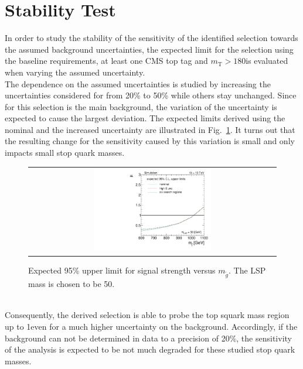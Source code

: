 \section{Stability Test}
\label{sec:stop_syst}
In order to study the stability of the sensitivity of the identified selection towards the assumed background uncertainties, the expected limit for the selection using the baseline requirements, at least one CMS top tag and $m_\mathrm{T} > 180$\gev is evaluated when varying the assumed \ttbar uncertainty. \\
The dependence on the assumed uncertainties is studied by increasing the uncertainties considered for \ttbar from 20\% to 50\% while others stay unchanged. Since for this selection \ttbar is the main background, the variation of the \ttbar uncertainty is expected to cause the largest deviation. 
The expected limits derived using the nominal and the increased \ttbar uncertainty are illustrated in Fig.~\ref{fig:stop_varied_limit}. It turns out that the resulting change for the sensitivity caused by this variation is small and only impacts small stop quark masses.  
\begin{figure}[!t]
  \centering
  \begin{tabular}{c}
                \includegraphics[width=0.49\textwidth]{figures/limitplot4BinSel_SystVariation_LSP50.pdf} 
  \end{tabular}
  \caption{Expected 95\% upper limit for signal strength versus $m_{\tilde{g}}$. The LSP mass is chosen to be 50\gev.}
  \label{fig:stop_varied_limit}
\end{figure}
\\
Consequently, the derived selection is able to probe the top squark mass region up to 1\tev even for a much higher uncertainty on the \ttbar background. Accordingly, if the \ttbar background can not be determined in data to a precision of 20\%, the sensitivity of the analysis is expected to be not much degraded for these studied stop quark masses.              

